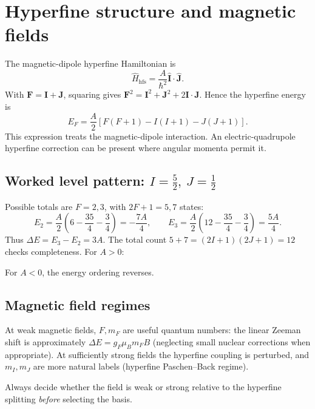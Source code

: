 
\section{Hyperfine structure and magnetic fields}
The magnetic-dipole hyperfine Hamiltonian is
\[
\hat H_{\mathrm{hfs}}=\frac{A}{\hbar^2}\hat{\mathbf I}\cdot\hat{\mathbf J}.
\]
With \(\mathbf F=\mathbf I+\mathbf J\), squaring gives
\(\mathbf F^2=\mathbf I^2+\mathbf J^2+2\mathbf I\cdot\mathbf J\).
Hence the hyperfine energy is
\[
\boxed{E_F=\frac A2[F(F+1)-I(I+1)-J(J+1)].}
\]
This expression treats the magnetic-dipole interaction. An electric-quadrupole
hyperfine correction can be present where angular momenta permit it.
\subsection{Worked level pattern: \(I=\frac52,\ J=\frac12\)}
Possible totals are \(F=2,3\), with \(2F+1=5,7\) states:
\[
E_2=\frac A2\left(6-\frac{35}{4}-\frac34\right)=-\frac{7A}{4},
\qquad
E_3=\frac A2\left(12-\frac{35}{4}-\frac34\right)=\frac{5A}{4}.
\]
Thus \(\Delta E=E_3-E_2=3A\). The total count
\(5+7=(2I+1)(2J+1)=12\) checks completeness. For \(A>0\):
\begin{center}
\end{center}
For \(A<0\), the energy ordering reverses.
\subsection{Magnetic field regimes}
At weak magnetic fields, \(F,m_F\) are useful quantum numbers:
the linear Zeeman shift is approximately \(\Delta E=g_F\mu_Bm_FB\)
(neglecting small nuclear corrections when appropriate).
At sufficiently strong fields the hyperfine coupling is perturbed,
and \(m_I,m_J\) are more natural labels (hyperfine Paschen--Back regime).
\begin{cautionbox}
Always decide whether the field is weak or strong relative to the hyperfine
splitting \emph{before} selecting the basis.
\end{cautionbox}
